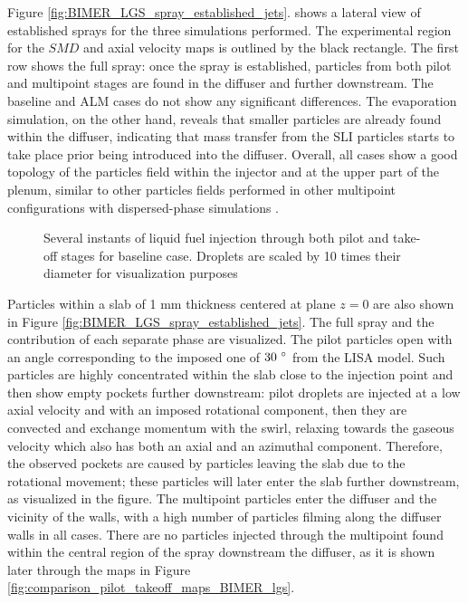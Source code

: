 Figure \ref{fig:BIMER_LGS_spray_established_jets}. shows a lateral view of established sprays for the three simulations performed. The experimental region for the $SMD$ and axial velocity maps is outlined by the black rectangle. The first row shows the full spray: once the spray is established, particles from both pilot and multipoint stages are found in the diffuser and further downstream. The baseline and ALM cases do not show any significant differences. The evaporation simulation, on the other hand, reveals that smaller particles are already found within the diffuser, indicating that mass transfer from the SLI particles starts to take place prior being introduced into the diffuser. Overall, all cases show a good topology of the particles field within the injector and at the upper part of the plenum, similar to other particles fields performed in other multipoint configurations with dispersed-phase simulations . 

\clearpage

\begin{figure}[h!]
	\centering	{}
	\caption[Several instants of liquid fuel injection through both pilot and take-off stages for baseline case]{Several instants of liquid fuel injection through both pilot and take-off stages for baseline case. Droplets are scaled by 10 times their diameter for visualization purposes}	\label{fig:BIMER_LGS_spray_establishment}
\end{figure}




Particles within a slab of 1 mm thickness centered at plane $z = 0$ are also shown in Figure \ref{fig:BIMER_LGS_spray_established_jets}. The full spray and the contribution of each separate phase are visualized. The pilot particles open with an angle corresponding to the imposed one of $30~\degree$ from the LISA model. Such particles are highly concentrated within the slab close to the injection point and then show empty pockets further downstream: pilot droplets are injected at a low axial velocity and with an imposed rotational component, then they are convected and exchange momentum with the swirl, relaxing towards the gaseous velocity which also has both an axial and an azimuthal component. Therefore, the observed pockets are caused by particles leaving the slab due to the rotational movement; these particles will later enter the slab further downstream, as visualized in the figure. The multipoint particles enter the diffuser and the vicinity of the walls, with a high number of particles filming along the diffuser walls in all cases. There are no particles injected through the multipoint found within the central region of the spray downstream the diffuser, as it is shown later through the maps in Figure \ref{fig:comparison_pilot_takeoff_maps_BIMER_lgs}.


